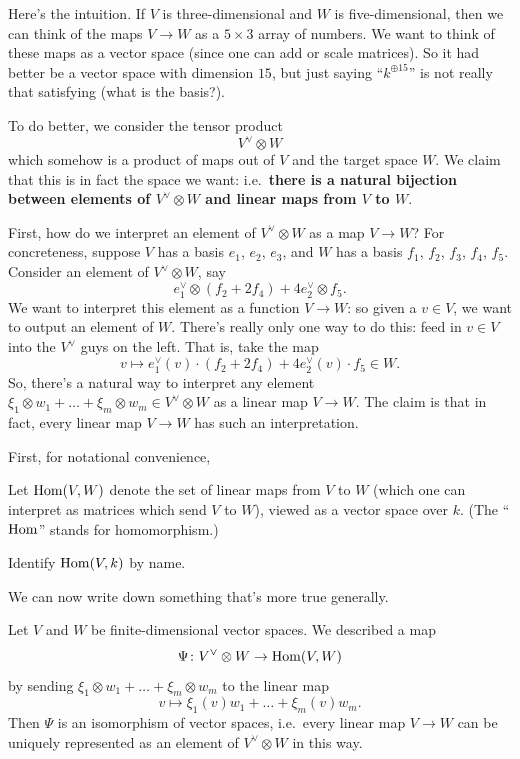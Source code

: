 Here's the intuition.
If $V$ is three-dimensional and $W$ is five-dimensional, then we can think
of the maps $V \to W$ as a $5 \times 3$ array of numbers.
We want to think of these maps as a vector space
(since one can add or scale matrices).
So it had better be a vector space with dimension $15$,
but just saying ``$k^{\oplus 15}$'' is not really that satisfying
(what is the basis?).

To do better, we consider the tensor product
\[ V^\vee \otimes W \]
which somehow is a product of maps out of $V$ and the target space $W$.
We claim that this is in fact the space we want:
i.e.\ \textbf{there is a natural bijection between elements of $V^\vee \otimes W$
and linear maps from $V$ to $W$}.

First, how do we interpret an element of $V^\vee \otimes W$ as a map $V \to W$?
For concreteness, suppose $V$ has a basis $e_1$, $e_2$, $e_3$,
and $W$ has a basis $f_1$, $f_2$, $f_3$, $f_4$, $f_5$.
Consider an element of $V^\vee \otimes W$, say
\[ e_1^\vee \otimes (f_2 + 2f_4) + 4e_2^\vee \otimes f_5. \]
We want to interpret this element as a function $V \to W$:
so given a $v \in V$,
we want to output an element of $W$.
There's really only one way to do this:
feed in $v \in V$ into the $V^\vee$ guys on the left.
That is, take the map
\[ v \mapsto e_1^\vee(v) \cdot (f_2 + 2f_4) + 4e_2^\vee(v) \cdot f_5 \in W. \]
So, there's a natural way to interpret any element
$\xi_1 \otimes w_1 + \dots + \xi_m \otimes w_m \in V^\vee \otimes W$
as a linear map $V \to W$.
The claim is that in fact, every linear map $V \to W$ has
such an interpretation.

First, for notational convenience,
\begin{definition}
	Let $\operatorname{Hom}(V,W)$ denote the set of linear maps from $V$ to $W$
	(which one can interpret as matrices which send $V$ to $W$),
	viewed as a vector space over $k$.
	(The ``$\operatorname{Hom}$'' stands for homomorphism.)
\end{definition}
\begin{ques}
	Identify $\operatorname{Hom}(V,k)$ by name.
\end{ques}

We can now write down something that's more true generally.
\begin{theorem}
	\label{thm:vect_hom_dualization}
	Let $V$ and $W$ be finite-dimensional vector spaces.
	We described a map
	\[ \Psi \colon V^\vee \otimes W \to \operatorname{Hom}(V,W) \]
	by sending $\xi_1 \otimes w_1 + \dots + \xi_m \otimes w_m$ to the linear map
	\[ v \mapsto \xi_1(v) w_1 + \dots + \xi_m(v) w_m. \]
	Then $\Psi$ is an isomorphism of vector spaces, i.e.\ every linear map $V \to W$
	can be uniquely represented as an element of $V^\vee \otimes W$ in this way.
\end{theorem}

